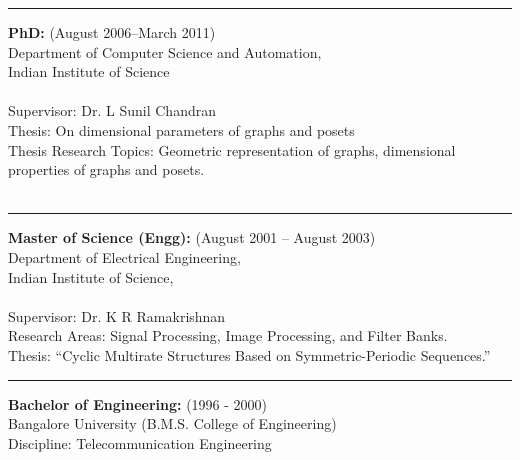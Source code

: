 \documentclass{article}
\begin{document}
\vspace{-2mm}\hrule\vspace{5mm}
\textbf{PhD:} (August 2006--March 2011)\\
Department of Computer Science and Automation,\\
Indian Institute of Science\\ 
\\
{Supervisor}: {Dr. L Sunil Chandran}\\
{Thesis}: On dimensional parameters of graphs and posets\\
{Thesis Research Topics}: Geometric representation of graphs,
dimensional properties of graphs and posets. \\
~~~~~~~~~\\
\vspace{-2mm}\hrule\vspace{2mm}
\noindent\textbf{Master of Science (Engg):} (August 2001 -- August 2003)\\
Department of Electrical Engineering,\\
Indian Institute of Science,\\
\\
Supervisor: Dr. K R Ramakrishnan\\
Research Areas: Signal Processing, Image Processing, and Filter
Banks.\\
Thesis: ``Cyclic Multirate Structures Based on Symmetric-Periodic
Sequences.''\\
\vspace{-2mm}\hrule\vspace{2mm}
\noindent\textbf{Bachelor of Engineering:} (1996 - 2000)\\
Bangalore University (B.M.S. College of Engineering)\\
Discipline: Telecommunication Engineering\\
\end{document}
